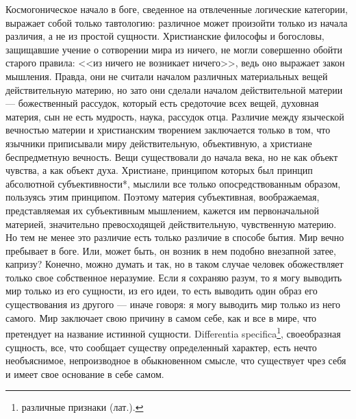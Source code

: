 \documentclass[12pt,oneside]{book}
\begin{document}
Космогоническое начало в боге, сведенное на отвлеченные логические категории, выражает собой только тавтологию: различное может произойти только из начала различия, а не из простой сущности. Христианские философы и богословы, защищавшие учение о сотворении мира из ничего, не могли совершенно обойти старого правила: <<из ничего не возникает ничего>>, ведь оно выражает закон мышления. Правда, они не считали началом различных материальных вещей действительную материю, но зато они сделали началом действительной материи --- божественный рассудок, который есть средоточие всех вещей, духовная материя, сын не есть мудрость, наука, рассудок отца. Различие между языческой вечностью материи и христианским творением заключается только в том, что язычники приписывали миру действительную, объективную, а христиане беспредметную вечность. Вещи существовали до начала века, но не как объект чувства, а как объект духа. Христиане, принципом которых был принцип абсолютной субъективности*\let\svthefootnote\thefootnote\let\thefootnote\relax{}\let\thefootnote\svthefootnote, мыслили все только опосредствованным образом, пользуясь этим принципом. Поэтому материя субъективная, воображаемая, представляемая их субъективным мышлением, кажется им первоначальной материей, значительно превосходящей действительную, чувственную материю. Но тем не менее это различие есть только различие в способе бытия. Мир вечно пребывает в боге. Или, может быть, он возник в нем подобно внезапной затее, капризу? Конечно, можно думать и так, но в таком случае человек обожествляет только свое собственное неразумие. Если я сохраняю разум, то я могу выводить мир только из его сущности, из его идеи, то есть выводить один образ его существования из другого --- иначе говоря: я могу выводить мир только из него самого. Мир заключает свою причину в самом себе, как и все в мире, что претендует на название истинной сущности. Differentia specifica\footnote{различные признаки (лат.).}, своеобразная сущность, все, что сообщает существу определенный характер, есть нечто необъяснимое, непроизводное в обыкновенном смысле, что существует чрез себя и имеет свое основание в себе самом.
\end{document}
